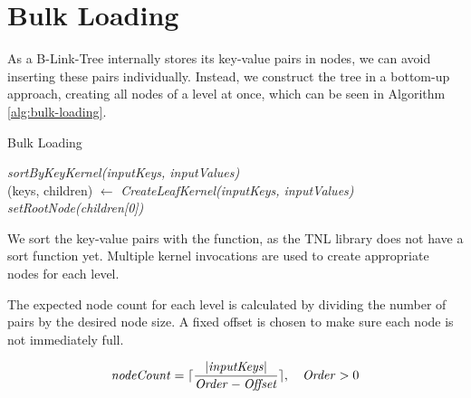 \section{Bulk Loading}

As a B-Link-Tree internally stores its key-value pairs in nodes, we can avoid inserting these pairs individually. Instead, we construct the tree in a bottom-up approach, creating all nodes of a level at once, which can be seen in Algorithm \ref{alg:bulk-loading}.

\begin{algorithm}[H]
  \caption{Bulk Loading}\label{alg:bulk-loading}

  \textit{sortByKeyKernel(inputKeys, inputValues)}\\
  (keys, children) $\gets$ \textit{CreateLeafKernel(inputKeys, inputValues)}\\
  \textit{setRootNode(children[0])}
\end{algorithm}

We sort the key-value pairs with the  function, as the TNL library does not have a sort function yet. Multiple kernel invocations are used to create appropriate nodes for each level.

The expected node count for each level is calculated by dividing the number of pairs by the desired node size. A fixed offset is chosen to make sure each node is not immediately full.

$$\mathit{nodeCount} = \lceil\frac{|\mathit{inputKeys}|}{\mathit{Order} - \mathit{Offset}}\rceil,\quad \begin{aligned} \mathit{Order} > 0\end{aligned}$$


